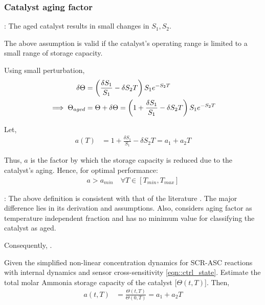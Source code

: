 \subsubsection{Catalyst aging factor}

: The aged catalyst results in small changes in
$S_1, S_2$.

The above assumption is valid if the catalyst's operating range is limited to a
small range of storage capacity.

Using small perturbation,
\begin{align*}
    \delta \Theta &= \left( \frac{\delta S_1}{S_1} - \delta S_2T \right) S_1 e^{-S_2 T}\\
    \implies \Theta_{aged} &= \Theta + \delta \Theta = \left( 1 + \frac{\delta S_1}{S_1} - \delta S_2T \right) S_1 e^{-S_2 T}
\end{align*}

Let,
\begin{align*}
    a(T) &= 1 + \frac{\delta S_1}{S_1} - \delta S_2T = a_1 + a_2 T
\end{align*}

Thus, $a$ is the factor by which the storage capacity is reduced due to the
catalyst's aging. Hence, for optimal performance:
\begin{align*}
    a > a_{min} \quad \forall T \in [T_{min}, T_{max}]
\end{align*}

: The above definition is consistent with that of the literature
\cite{ma2017observer}. The major difference lies in its derivation and
assumptions. Also, \cite{ma2017observer} considers aging factor as temperature
independent fraction and has no minimum value for classifying the catalyst as aged.

Consequently, .\\



Given the simplified non-linear concentration dynamics for SCR-ASC
reactions with internal dynamics and sensor cross-sensitivity
\ref{eqn::ctrl_state}. Estimate the total molar
Ammonia storage capacity of the catalyst [$\Theta(t, T)$]. Then,
\begin{align*}
    a(t, T) &= \frac{\Theta(t, T)}{\Theta(0, T)} = a_1 + a_2 T
\end{align*}


